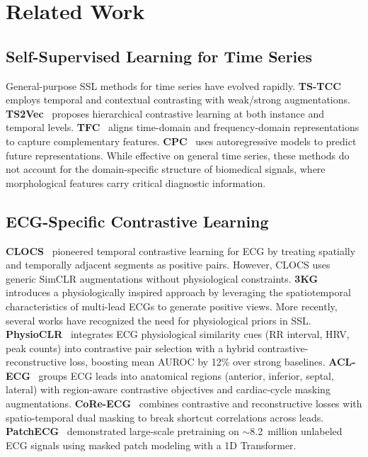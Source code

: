 \documentclass[journal,10pt]{IEEEtran}
\begin{document}

\section{Related Work}
\label{sec:related}

\subsection{Self-Supervised Learning for Time Series}

General-purpose SSL methods for time series have evolved rapidly. \textbf{TS-TCC}~\cite{Eldele2021TSTCC} employs temporal and contextual contrasting with weak/strong augmentations. \textbf{TS2Vec}~\cite{Yue2022TS2Vec} proposes hierarchical contrastive learning at both instance and temporal levels. \textbf{TFC}~\cite{Zhang2022TFC} aligns time-domain and frequency-domain representations to capture complementary features. \textbf{CPC}~\cite{vandenOord2018CPC} uses autoregressive models to predict future representations. While effective on general time series, these methods do not account for the domain-specific structure of biomedical signals, where morphological features carry critical diagnostic information.

\subsection{ECG-Specific Contrastive Learning}

\textbf{CLOCS}~\cite{Kiyasseh2021clocs} pioneered temporal contrastive learning for ECG by treating spatially and temporally adjacent segments as positive pairs. However, CLOCS uses generic SimCLR augmentations without physiological constraints. \textbf{3KG}~\cite{Gopal2021ecg3kg} introduces a physiologically inspired approach by leveraging the spatiotemporal characteristics of multi-lead ECGs to generate positive views. More recently, several works have recognized the need for physiological priors in SSL. \textbf{PhysioCLR}~\cite{physioclr2025} integrates ECG physiological similarity cues (RR interval, HRV, peak counts) into contrastive pair selection with a hybrid contrastive-reconstructive loss, boosting mean AUROC by 12\% over strong baselines. \textbf{ACL-ECG}~\cite{aclecg2026} groups ECG leads into anatomical regions (anterior, inferior, septal, lateral) with region-aware contrastive objectives and cardiac-cycle masking augmentations. \textbf{CoRe-ECG}~\cite{coreecg2026} combines contrastive and reconstructive losses with spatio-temporal dual masking to break shortcut correlations across leads. \textbf{PatchECG}~\cite{patchecg2024} demonstrated large-scale pretraining on $\sim$8.2~million unlabeled ECG signals using masked patch modeling with a 1D Transformer.
\end{document}

